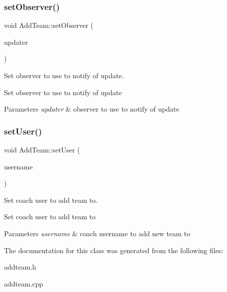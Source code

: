 \subsubsection{\texorpdfstring{setObserver()}{setObserver()}}
{\footnotesize\ttfamily void Add\+Team\+::set\+Observer (\begin{DoxyParamCaption}\item[{\mbox{\hyperlink{classFileUpdater}{File\+Updater}} $\ast$}]{updater }\end{DoxyParamCaption})}



Set observer to use to notify of update. 

Set observer to use to notify of update 
\begin{DoxyParams}{Parameters}
{\em updater} & observer to use to notify of update \\
\hline
\end{DoxyParams}
\mbox{\label{classAddTeam_a6b726fb565e134749f0188e24e11d419}} 
\subsubsection{\texorpdfstring{setUser()}{setUser()}}
{\footnotesize\ttfamily void Add\+Team\+::set\+User (\begin{DoxyParamCaption}\item[{std\+::string}]{username }\end{DoxyParamCaption})}



Set coach user to add team to. 

Set coach user to add team to 
\begin{DoxyParams}{Parameters}
{\em username} & coach username to add new team to \\
\hline
\end{DoxyParams}


The documentation for this class was generated from the following files\+:\begin{DoxyCompactItemize}
\item 
addteam.\+h\item 
addteam.\+cpp\end{DoxyCompactItemize}
